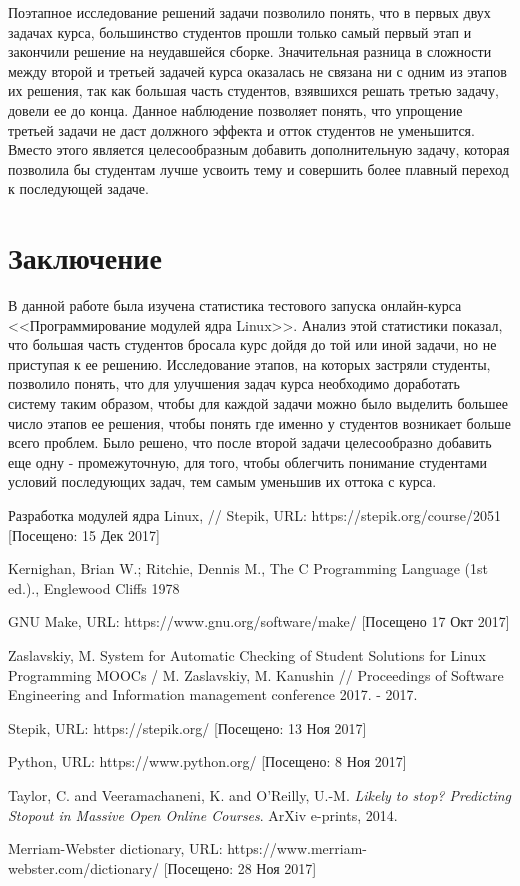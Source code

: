 \documentclass[a4paper,12pt]{article}
\begin{document}
Поэтапное исследование решений задачи позволило понять, что в первых двух задачах курса, большинство студентов прошли только самый первый этап и закончили решение на неудавшейся сборке. Значительная разница в сложности между второй и третьей задачей курса оказалась не связана ни с одним из этапов их решения, так как большая часть студентов, взявшихся решать третью задачу, довели ее до конца. Данное наблюдение позволяет понять, что упрощение третьей задачи не даст должного эффекта и отток студентов не уменьшится. Вместо этого является целесообразным добавить дополнительную задачу, которая позволила бы студентам лучше усвоить тему и совершить более плавный переход к последующей задаче.

\section{Заключение}
В данной работе была изучена статистика тестового запуска онлайн-курса <<Программирование модулей ядра Linux>>. Анализ этой статистики показал, что большая часть студентов бросала курс дойдя до той или иной задачи, но не приступая к ее решению. Исследование этапов, на которых застряли студенты, позволило понять, что для улучшения задач курса необходимо доработать систему таким образом, чтобы для каждой задачи можно было выделить большее число этапов ее решения, чтобы понять где именно у студентов возникает больше всего проблем. Было решено, что после второй задачи целесообразно добавить еще одну - промежуточную, для того, чтобы облегчить понимание студентами условий последующих задач, тем самым уменьшив их оттока с курса.
{\footnotesize\begin{thebibliography}{9}
	Разработка модулей ядра Linux, // Stepik, URL:
	https://stepik.org/course/2051
	[Посещено: 15 Дек 2017]
	
	Kernighan, Brian W.; Ritchie, Dennis M.,
	The C Programming Language (1st ed.).,
	Englewood Cliffs 1978
	
	GNU Make,
	URL: https://www.gnu.org/software/make/
	[Посещено 17 Окт 2017]
	
	Zaslavskiy, M. System for Automatic Checking of Student Solutions for Linux Programming MOOCs / 
	M. Zaslavskiy, M. Kanushin //
	Proceedings of Software Engineering and Information management conference 2017. - 2017.
	
	Stepik,
	URL: https://stepik.org/
	[Посещено: 13 Ноя 2017]
	
	Python,
	URL: https://www.python.org/
	[Посещено: 8 Ноя 2017]
	
	{Taylor}, C. and {Veeramachaneni}, K. and {O'Reilly}, U.-M.
	\textit{Likely to stop? Predicting Stopout in Massive Open Online Courses}.
	ArXiv e-prints, 2014.
	
	Merriam-Webster dictionary,
	URL: https://www.merriam-webster.com/dictionary/
	[Посещено: 28 Ноя 2017]	
\end{thebibliography}}
\end{document}
